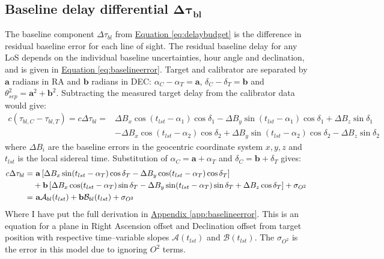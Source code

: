 	\subsection{Baseline delay differential $\boldsymbol{\Delta\tau_{bl}}$}
		The baseline component $\Delta\tau_{bl}$ from \hyperref[eq:delaybudget]{Equation \ref*{eq:delaybudget}} is the difference in residual baseline error for each line of sight. The residual baseline delay for any LoS depends on the individual baseline uncertainties, hour angle and declination, and is given in \hyperref[eq:baselineerror]{Equation \ref*{eq:baselineerror}}. Target and calibrator are separated by $\textbf{a}$ radians in RA and $\textbf{b}$ radians in DEC: $\alpha_C-\alpha_T=\textbf{a}$, $\delta_C-\delta_T=\textbf{b}$ and $\theta_{sep}^2 = \textbf{a}^2+\textbf{b}^2$. Subtracting the measured target delay from the calibrator data would give:
		\begin{equation}
			\begin{split}
				c(\tau_{bl,C}-\tau_{bl,T}) = c\Delta\tau_{bl} =&  \Delta B_x\cos(t_{lst}-\alpha_1)\cos\delta_1 - \Delta B_y\sin(t_{lst}-\alpha_1)\cos\delta_1 + \Delta B_z\sin\delta_1 \\
				&- \Delta B_x\cos(t_{lst}-\alpha_2)\cos\delta_2 + \Delta B_y\sin(t_{lst}-\alpha_2)\cos\delta_2 - \Delta B_z\sin\delta_2
			\end{split}
		\end{equation} where $\Delta B_i$ are the baseline errors in the geocentric coordinate system $x,y,z$ and $t_{lst}$ is the local sidereal time. Substitution of $\alpha_C=\textbf{a}+\alpha_T$ and $\delta_C=\textbf{b}+\delta_T$ gives:
		\begin{equation}
			\begin{split}
				c\Delta\tau_{bl} =&~{\bf a} \left[ \Delta B_x\sin(t_{lst}-\alpha_T)\cos\delta_T - \Delta B_y\cos(t_{lst}-\alpha_T)\cos\delta_T \right] \\
				&+ {\bf b} \left[ \Delta B_x\cos(t_{lst}-\alpha_T)\sin\delta_T - \Delta B_y\sin(t_{lst}-\alpha_T)\sin\delta_T + \Delta B_z\cos\delta_T\right] + \sigma_{O^2} \\
			=&~{\bf a} \mathcal{A}_{bl}(t_{lst}) + {\bf b}\mathcal{B}_{bl}(t_{lst}) + \sigma_{O^2}%
			\end{split}
			\label{eq:baselineslope}
		\end{equation} Where I have put the full derivation in \hyperref[app:baselineerror]{Appendix \ref*{app:baselineerror}}. This is an equation for a plane in Right Ascension offset and Declination offset from target position with respective time--variable slopes $\mathcal{A}(t_{lst})$ and $\mathcal{B}(t_{lst})$. The $\sigma_{O^2}$ is the error in this model due to ignoring $O^2$ terms.
		
